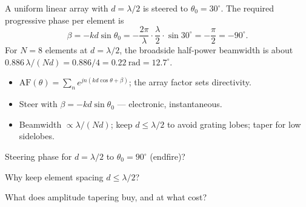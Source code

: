 \begin{workedexample}
A uniform linear array with $d = \lambda/2$ is steered to $\theta_0 = 30^\circ$.
The required progressive phase per element is
\[ \beta = -k d \sin\theta_0 = -\frac{2\pi}{\lambda}\cdot\frac{\lambda}{2}\cdot\sin30^\circ = -\frac{\pi}{2} = -90^\circ. \]
For $N = 8$ elements at $d=\lambda/2$, the broadside half-power beamwidth is about
$0.886\,\lambda/(Nd) = 0.886/4 = 0.22\ \text{rad} = 12.7^\circ$.
\end{workedexample}

\begin{keytakeaways}
\begin{itemize}[leftmargin=1.4em,itemsep=2pt]
\item $\text{AF}(\theta) = \sum_n e^{jn(kd\cos\theta+\beta)}$; the array factor sets directivity.
\item Steer with $\beta = -kd\sin\theta_0$ --- electronic, instantaneous.
\item Beamwidth $\propto \lambda/(Nd)$; keep $d \le \lambda/2$ to avoid grating lobes; taper for low sidelobes.
\end{itemize}
\end{keytakeaways}

\begin{exercises}
\item Steering phase for $d = \lambda/2$ to $\theta_0 = 90^\circ$ (endfire)?
\item Why keep element spacing $d \le \lambda/2$?
\item What does amplitude tapering buy, and at what cost?
\end{exercises}

